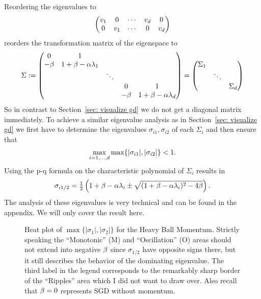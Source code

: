 %
Reordering the eigenvalues to
%
\begin{align*}
	\begin{pmatrix}
		v_1 & 0 & \cdots & v_d & 0 \\
		0 & v_1 & \cdots & 0 & v_d
	\end{pmatrix}
\end{align*}
%
reorders the transformation matrix of the eigenspace to
%
\begin{align}\label{eq: eigenspace momentum transformation}
	\Sigma := \begin{pmatrix}
		0 & 1 \\
		-\beta & 1+\beta - \alpha\lambda_1 & \\
		& & \ddots & \\
		& & & 0 & 1 \\
		& & & -\beta & 1+\beta - \alpha\lambda_d \\
	\end{pmatrix}
	= \begin{pmatrix}
		\Sigma_1 \\
		& \ddots\\
		&& \Sigma_d
	\end{pmatrix}
\end{align}
%
So in contrast to Section~\ref{sec: visualize gd} we do not get a diagonal
matrix immediately. To achieve a similar eigenvalue analysis as in
Section~\ref{sec: visualize gd} we first have to determine the eigenvalues
\(\sigma_{i1},\sigma_{i2}\) of each \(\Sigma_i\) and then ensure that
\begin{align}
	\max_{i=1,\dots, d} \max\{|\sigma_{i1}|,|\sigma_{i2}|\} < 1.
\end{align}
Using the p-q formula on the characteristic polynomial of \(\Sigma_i\)
results in 
\begin{align*}
	\sigma_{i1/2}
	= \tfrac12 \left(
		1+\beta-\alpha\lambda_i
		\pm \sqrt{(1+\beta-\alpha\lambda_i)^2 - 4\beta}
	\right).
\end{align*}
%
The analysis of these eigenvalues is very technical and can be found in the
appendix. We will only cover the result here.

\begin{figure}[h]
	\centering
	\def\svgwidth{1\textwidth}
	
	\caption{
		Heat plot of \(\max\{|\sigma_1|,|\sigma_2|\}\) for the Heavy Ball Momentum.
		Strictly speaking the ``Monotonic'' (M) and ``Oscillation'' (O) areas should not
		extend into negative \(\beta\) since \(\sigma_{1/2}\)
		have opposite signs there, but it still describes the behavior of the
		dominating eigenvalue. The third label in the legend corresponds to the
		remarkably sharp border of the ``Ripples'' area which I did not want to
		draw over. Also recall that \(\beta=0\) represents SGD
		without momentum.
	}
	\label{fig: annotated heavy ball rates}
\end{figure}

